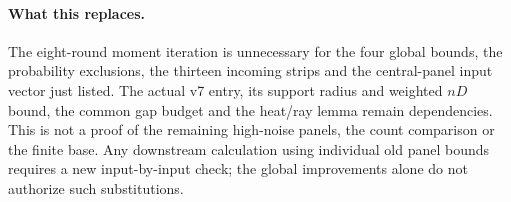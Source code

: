 \paragraph{What this replaces.}
The eight-round moment iteration is unnecessary for the four global
bounds, the probability exclusions, the thirteen incoming strips and the
central-panel input vector just listed. The actual v7 entry, its support
radius and weighted $nD$ bound, the common gap budget and the heat/ray
lemma remain dependencies. This is not a proof of the remaining
high-noise panels, the count comparison or the finite base. Any downstream
calculation using individual old panel bounds requires a new input-by-input
check; the global improvements alone do not authorize such substitutions.

